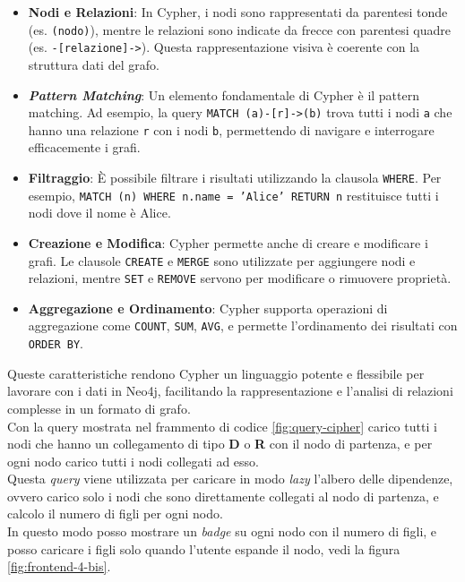 \begin{itemize}
\item \textbf{Nodi e Relazioni}: In Cypher, i nodi sono rappresentati da parentesi tonde (es. \texttt{(nodo)}), 
mentre le relazioni sono indicate da frecce con parentesi quadre (es. \texttt{-[relazione]->}). Questa rappresentazione visiva è coerente con la struttura dati del grafo.

\item \textbf{\textit{Pattern Matching}}: Un elemento fondamentale di Cypher è il pattern matching. 
Ad esempio, la query \texttt{MATCH (a)-[r]->(b)} trova tutti i nodi \texttt{a} che hanno una relazione \texttt{r} con i nodi \texttt{b}, permettendo di navigare e interrogare efficacemente i grafi.

\item \textbf{Filtraggio}: È possibile filtrare i risultati utilizzando la clausola \texttt{WHERE}. 
Per esempio, \texttt{MATCH (n) WHERE n.name = 'Alice' RETURN n} restituisce tutti i nodi dove il nome è Alice.

\item \textbf{Creazione e Modifica}: Cypher permette anche di creare e modificare i grafi. 
Le clausole \texttt{CREATE} e \texttt{MERGE} sono utilizzate per aggiungere nodi e relazioni, mentre \texttt{SET} e \texttt{REMOVE} servono per modificare o rimuovere proprietà.

\item \textbf{Aggregazione e Ordinamento}: Cypher supporta operazioni di aggregazione come \texttt{COUNT}, \texttt{SUM}, 
\texttt{AVG}, e permette l'ordinamento dei risultati con \texttt{ORDER BY}.
\end{itemize}

Queste caratteristiche rendono Cypher un linguaggio potente e flessibile per lavorare con i dati in Neo4j, 
facilitando la rappresentazione e l'analisi di relazioni complesse in un formato di grafo.\\

Con la query mostrata nel frammento di codice \ref*{fig:query-cipher} carico tutti i nodi che hanno un collegamento di tipo \textbf{D} o \textbf{R} con il nodo di partenza,
e per ogni nodo carico tutti i nodi collegati ad esso.\\
Questa \textit{query} viene utilizzata per caricare in modo \textit{lazy} l'albero delle dipendenze, ovvero carico solo i nodi che sono direttamente collegati al nodo di partenza,
e calcolo il numero di figli per ogni nodo.\\ In questo modo posso mostrare un \textit{badge} su ogni nodo con il numero di figli, e posso caricare i figli solo quando l'utente espande il nodo, 
vedi la figura \ref{fig:frontend-4-bis}.\\

